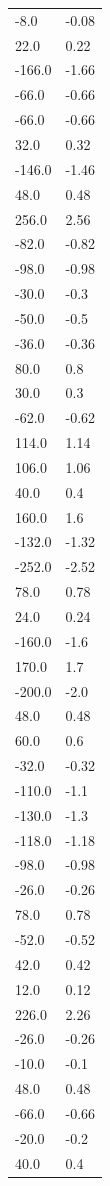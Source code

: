 \begin{longtable}{ll}
-8.0 & -0.08 \\
22.0 & 0.22 \\
-166.0 & -1.66 \\
-66.0 & -0.66 \\
-66.0 & -0.66 \\
32.0 & 0.32 \\
-146.0 & -1.46 \\
48.0 & 0.48 \\
256.0 & 2.56 \\
-82.0 & -0.82 \\
-98.0 & -0.98 \\
-30.0 & -0.3 \\
-50.0 & -0.5 \\
-36.0 & -0.36 \\
80.0 & 0.8 \\
30.0 & 0.3 \\
-62.0 & -0.62 \\
114.0 & 1.14 \\
106.0 & 1.06 \\
40.0 & 0.4 \\
160.0 & 1.6 \\
-132.0 & -1.32 \\
-252.0 & -2.52 \\
78.0 & 0.78 \\
24.0 & 0.24 \\
-160.0 & -1.6 \\
170.0 & 1.7 \\
-200.0 & -2.0 \\
48.0 & 0.48 \\
60.0 & 0.6 \\
-32.0 & -0.32 \\
-110.0 & -1.1 \\
-130.0 & -1.3 \\
-118.0 & -1.18 \\
-98.0 & -0.98 \\
-26.0 & -0.26 \\
78.0 & 0.78 \\
-52.0 & -0.52 \\
42.0 & 0.42 \\
12.0 & 0.12 \\
226.0 & 2.26 \\
-26.0 & -0.26 \\
-10.0 & -0.1 \\
48.0 & 0.48 \\
-66.0 & -0.66 \\
-20.0 & -0.2 \\
40.0 & 0.4 \\

\end{longtable}
